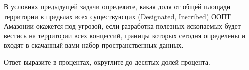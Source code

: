 
В условиях предыдущей задачи определите, какая доля от общей площади территории в пределах всех существующих 
(Designated, Inscribed) ООПТ Амазонии окажется под угрозой, если разработка полезных ископаемых будет 
вестись на территории всех концессий, границы которых сегодня определены и входят в скачанный вами набор 
пространственных данных.

Ответ выразите в процентах, округлите до десятых долей процента.